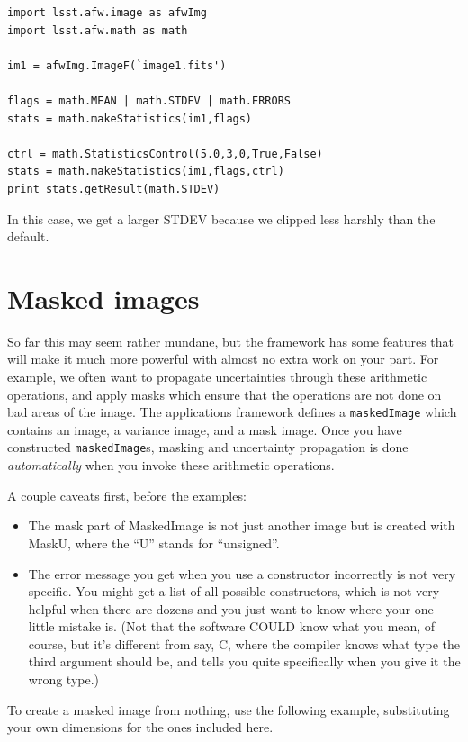 \begin{verbatim}
import lsst.afw.image as afwImg
import lsst.afw.math as math

im1 = afwImg.ImageF(`image1.fits')

flags = math.MEAN | math.STDEV | math.ERRORS 
stats = math.makeStatistics(im1,flags)

ctrl = math.StatisticsControl(5.0,3,0,True,False)
stats = math.makeStatistics(im1,flags,ctrl)
print stats.getResult(math.STDEV) 
\end{verbatim}

In this case, we get a larger STDEV because we clipped less harshly
than the default.


\section{Masked images}

So far this may seem rather mundane, but the framework has some
features that will make it much more powerful with almost no extra
work on your part.  For example, we often want to propagate
uncertainties through these arithmetic operations, and apply masks
which ensure that the operations are not done on bad areas of the
image.  The applications framework defines a \texttt{maskedImage}
which contains an image, a variance image, and a mask image.
Once you have constructed \texttt{maskedImage}s, masking and
uncertainty propagation is done {\it automatically} when you invoke
these arithmetic operations.

A couple caveats first, before the examples:
\begin{itemize}
\item The mask part of MaskedImage is not just another image but
is created with MaskU, where the ``U'' stands for ``unsigned''.
\item The error message you get when you use a constructor
incorrectly is not very specific.  You might get a list of all
possible constructors, which is not very helpful when there
are dozens and you just want to know where your one little mistake
is.  (Not that the software COULD know what you mean, of course,
but it's different from say, C, where the compiler knows what type
the third argument should be, and tells you quite specifically when you
give it the wrong type.)
\end{itemize}

To create a masked image from nothing, use the following example, substituting your own dimensions for the ones included here.

